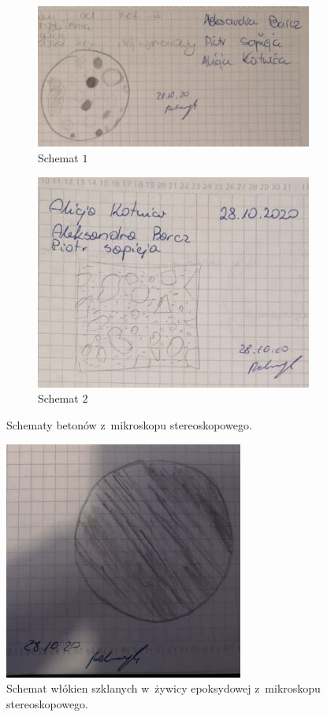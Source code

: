 \begin{figure}[H]
    \begin{subfigure}{.5\textwidth}
        \centering
        \includegraphics[width=.8\linewidth]{img/schemat3_bet.jpg}
        \caption{Schemat $1$}
    \end{subfigure}
    \begin{subfigure}{.5\textwidth}
        \centering
        \includegraphics[width=.9\linewidth]{img/schemat4_bet.jpg}
        \caption{Schemat $2$}
    \end{subfigure}
    \caption{Schematy betonów z~mikroskopu stereoskopowego.}
\end{figure}

\begin{figure}[H]
    \centering
    \includegraphics[width=0.7\textwidth]{img/schemat_ster_P.jpg}
    \caption{Schemat włókien szklanych w~żywicy epoksydowej z~mikroskopu stereoskopowego.}
\end{figure}


